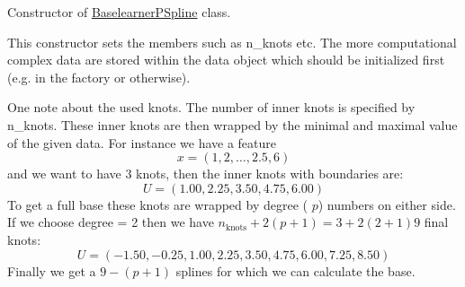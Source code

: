 Constructor of {\ttfamily \hyperlink{classblearner_1_1_baselearner_p_spline}{Baselearner\+P\+Spline}} class.

This constructor sets the members such as n\+\_\+knots etc. The more computational complex data are stored within the data object which should be initialized first (e.\+g. in the factory or otherwise).

One note about the used knots. The number of inner knots is specified by {\ttfamily n\+\_\+knots}. These inner knots are then wrapped by the minimal and maximal value of the given data. For instance we have a feature \[ x = (1, 2, \dots, 2.5, 6) \] and we want to have 3 knots, then the inner knots with boundaries are\+: \[ U = (1.00, 2.25, 3.50, 4.75, 6.00) \] To get a full base these knots are wrapped by {\ttfamily degree} ( $p$) numbers on either side. If we choose {\ttfamily degree = 2} then we have $n_\mathrm{knots} + 2(p + 1) = 3 + 2(2 + 1) 9$ final knots\+: \[ U = (-1.50, -0.25, 1.00, 2.25, 3.50, 4.75, 6.00, 7.25, 8.50) \] Finally we get a $9 - (p + 1)$ splines for which we can calculate the base.


